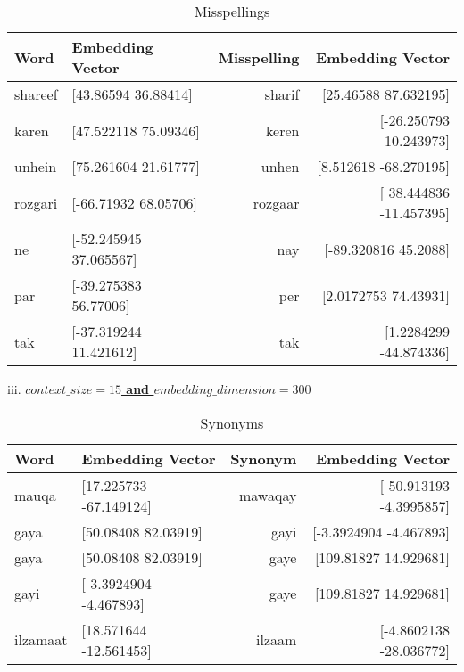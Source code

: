 \documentclass{exam}
\begin{document}
\begin{table}[h!]
  			\begin{center}
    			\caption{Misspellings}
    			\begin{tabular}{l|l|r|r}
      				\textbf{Word} & \textbf{Embedding Vector} & \textbf{Misspelling} & \textbf{Embedding Vector}\\
      				\hline
      				shareef & [43.86594 36.88414] & sharif & [25.46588  87.632195]\\
      				karen & [47.522118 75.09346] & keren & [-26.250793 -10.243973]\\
      				unhein & [75.261604 21.61777] & unhen & [8.512618 -68.270195]\\
      				rozgari & [-66.71932  68.05706] & rozgaar & [ 38.444836 -11.457395]\\
      				ne & [-52.245945  37.065567] & nay & [-89.320816  45.2088]\\
      				par & [-39.275383  56.77006] & per & [2.0172753 74.43931]\\
     				tak & [-37.319244  11.421612] & tak & [1.2284299 -44.874336]\\
    			\end{tabular}
  			\end{center}
\end{table}
\pagebreak

iii. \underline{\textbf{$context\_size = 15$ and $embedding\_dimension = 300$}}\\

\begin{table}[h!]
  			\begin{center}
    			\caption{Synonyms}
    			\begin{tabular}{l|l|r|r}
      				\textbf{Word} & \textbf{Embedding Vector} & \textbf{Synonym} & \textbf{Embedding Vector}\\
      				\hline
      				mauqa & [17.225733 -67.149124] & mawaqay & [-50.913193   -4.3995857]\\
      				gaya & [50.08408 82.03919] & gayi & [-3.3924904 -4.467893]\\
      				gaya & [50.08408 82.03919] & gaye & [109.81827   14.929681]\\
      				gayi & [-3.3924904 -4.467893] & gaye & [109.81827   14.929681]\\
      				ilzamaat & [18.571644 -12.561453] & ilzaam & [-4.8602138 -28.036772]\\
    			\end{tabular}
  			\end{center}
\end{table}
\end{document}
